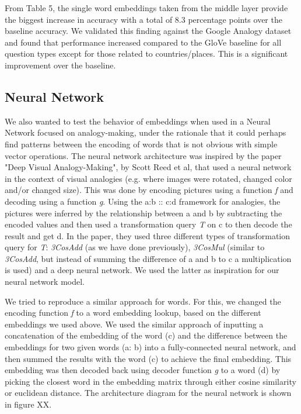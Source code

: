 \documentclass[11pt]{article}
\begin{document}
From Table 5, the single word embeddings taken from the middle layer provide the
biggest increase in accuracy with a total of 8.3 percentage points over the
baseline accuracy. We validated this finding against the Google Analogy dataset
and found that performance increased compared to the GloVe baseline for all
question types except for those related to countries/places. This is a
significant improvement over the baseline.

\subsection{Neural Network}

We also wanted to test the behavior of embeddings when used in a Neural
Network focused on analogy-making, under the rationale that it could
perhaps find patterns between the encoding of words that is not obvious
with simple vector operations. The neural network architecture was
inspired by the paper "Deep Visual Analogy-Making", by Scott Reed et al,
that used a neural network in the context of visual analogies (e.g.
where images were rotated, changed color and/or changed size). This was
done by encoding pictures using a function \emph{f} and decoding using a
function \emph{g}. Using the a:b :: c:d framework for analogies, the
pictures were inferred by the relationship between a and b by
subtracting the encoded values and then used a transformation query
\emph{T} on c to then decode the result and get d. In the paper, they
used three different types of transformation query for \emph{T}:
\emph{3CosAdd} (as we have done previously), \emph{3CosMul} (similar to
\emph{3CosAdd}, but instead of summing the difference of a and b to c a
multiplication is used) and a deep neural network. We used the latter as
inspiration for our neural network model.

We tried to reproduce a similar approach for words. For this, we changed
the encoding function \emph{f} to a word embedding lookup, based on the
different embeddings we used above. We used the similar approach of
inputting a concatenation of the embedding of the word (c) and the
difference between the embeddings for two given words (a: b) into a
fully-connected neural network, and then summed the results with the
word (c) to achieve the final embedding. This embedding was then decoded
back using decoder function \emph{g }to a word (d) by picking the
closest word in the embedding matrix through either cosine similarity or
euclidean distance. The architecture diagram for the neural network is
shown in figure XX.
\end{document}
